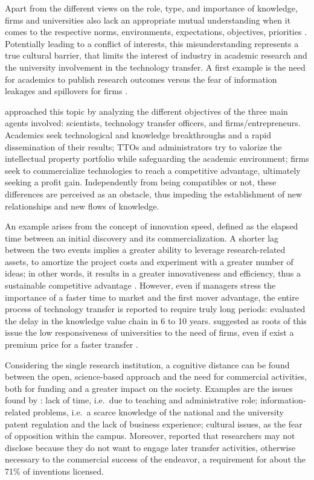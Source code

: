 Apart from the different views on the role, type, and importance of knowledge, firms and universities also lack an appropriate mutual understanding when it comes to the respective norms, environments, expectations, objectives, priorities \citep{Siegel2003a, Link2005, Muscio2010}. Potentially leading to a conflict of interests, this misunderstanding represents a true cultural barrier, that limits the interest of industry in academic research and the university involvement in the technology transfer. A first example is the need for academics to publish research outcomes versus the fear of information leakages and spillovers for firms \citep{Gilsing2011}.

\citet{Siegel2007} approached this topic by analyzing the different objectives of the three main agents involved: scientists, technology transfer officers, and firms/entrepreneurs. Academics seek technological and knowledge breakthroughs and a rapid dissemination of their results; TTOs and administrators try to valorize the intellectual property portfolio while safeguarding the academic environment; firms seek to commercialize technologies to reach a competitive advantage, ultimately seeking a profit gain. Independently from being compatibles or not, these differences are perceived as an obstacle, thus impeding the establishment of new relationships and new flows of knowledge.

An example arises from the concept of innovation speed, defined as the elapsed time between an initial discovery and its commercialization. A shorter lag between the two events implies a greater ability to leverage research-related assets, to amortize the project costs and experiment with a greater number of ideas; in other words, it results in a greater innovativeness and efficiency, thus a sustainable competitive advantage \citep{Markman2005}. However, even if managers stress the importance of a faster time to market and the first mover advantage, the entire process of technology transfer is reported to require truly long periods: \citet{Heher2006} evaluated the delay in the knowledge value chain in 6 to 10 years. \citet{Link2005} suggested as roots of this issue the low responsiveness of universities to the need of firms, even if exist a premium price for a faster transfer \citep{Markman2005}.

Considering the single research institution, a cognitive distance can be found between the open, science-based approach and the need for commercial activities, both for funding and a greater impact on the society. Examples are the issues found by \citet{Baldini2007}: lack of time, i.e.\ due to teaching and administrative role; information-related problems, i.e.\ a scarce knowledge of the national and the university patent regulation and the lack of business experience; cultural issues, as the fear of opposition within the campus. Moreover, \citet{Jensen2003} reported that researchers may not disclose because they do not want to engage later transfer activities, otherwise necessary to the commercial success of the endeavor, a requirement for about the 71\% of inventions licensed.

